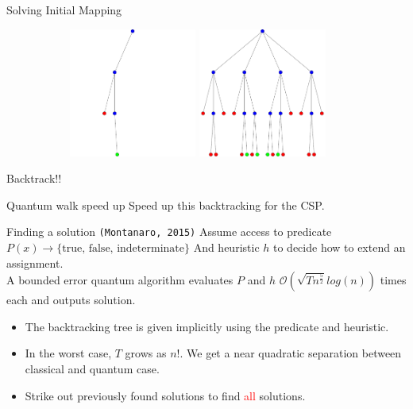 \documentclass{beamer}
\begin{document}
\begin{frame}{Solving Initial Mapping}
\begin{figure}
\begin{subfigure}[b]{0.6\textwidth}
\begin{overprint}
		\centering
		\includegraphics[height=120pt]{figures/tree6}
		\onslide<10->\centering
		\includegraphics[height=120pt]{figures/tree7}	
		\end{overprint}
     \end{subfigure}
     \hfill %
\end{figure}
\pause \pause \pause
Backtrack!!
\end{frame}

\begin{frame}{Quantum walk speed up}
	Speed up this backtracking for the CSP. \pause
	\begin{block}{Finding a solution \hfill {\small \texttt{(Montanaro, 2015)}}}
	Assume access to predicate $P(x) \rightarrow \text{\{true, false, indeterminate\}}$ \pause
	And heuristic $h$ to decide how to extend an assignment. \pause  \\
	
	A bounded error quantum algorithm evaluates $P$ and $h$ $\mathcal{O}(\sqrt{Tn^{\frac{5}{2}}}log(n))$ times each and outputs solution. \pause \\
	\end{block}
\begin{itemize}
	\item The backtracking tree is given implicitly using the predicate and heuristic.\pause
	\item In the worst case, $T$ grows as $n!$. We get a near quadratic separation between classical and quantum case.\pause
	\item Strike out previously found solutions to find \textcolor{red}{all} solutions.
\end{itemize}
	
\end{frame}
\end{document}
